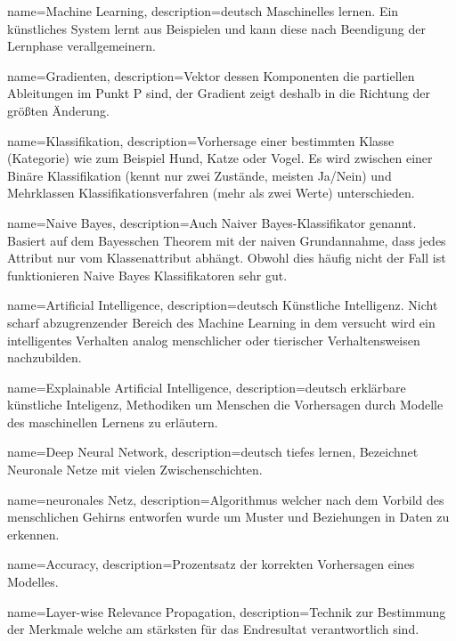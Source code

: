 
{
	name=Machine Learning,
	description={deutsch Maschinelles lernen. Ein künstliches System lernt aus Beispielen und kann diese nach Beendigung der Lernphase verallgemeinern. }
}

{
	name=Gradienten,
	description={Vektor dessen Komponenten die partiellen Ableitungen im Punkt P sind, der Gradient zeigt deshalb in die Richtung der größten Änderung. }
}

{
	name=Klassifikation,
	description={Vorhersage einer bestimmten Klasse (Kategorie) wie zum Beispiel Hund, Katze oder Vogel. Es wird zwischen einer Binäre Klassifikation (kennt nur zwei Zustände, meisten Ja/Nein) und Mehrklassen Klassifikationsverfahren (mehr als zwei Werte) unterschieden.  }
}

{
	name=Naive Bayes,
	description={Auch Naiver Bayes-Klassifikator genannt. Basiert auf dem Bayesschen Theorem mit der naiven Grundannahme, dass jedes Attribut nur vom Klassenattribut abhängt. Obwohl dies häufig nicht der Fall ist funktionieren Naive Bayes Klassifikatoren sehr gut. }
}

{
	name=Artificial Intelligence,
	description={deutsch Künstliche Intelligenz. Nicht scharf abzugrenzender Bereich des Machine Learning in dem versucht wird ein intelligentes Verhalten
	 analog menschlicher oder tierischer Verhaltensweisen nachzubilden. }
}

{
	name=Explainable Artificial Intelligence,
	description={deutsch erklärbare künstliche Inteligenz, Methodiken um Menschen die Vorhersagen durch Modelle des maschinellen Lernens zu erläutern. }
}

{
    name=Deep Neural Network,
    description={deutsch tiefes lernen, Bezeichnet Neuronale Netze mit vielen Zwischenschichten.}
}

{
	name=neuronales Netz,
	description={Algorithmus welcher nach dem Vorbild des menschlichen Gehirns entworfen wurde um Muster und Beziehungen in Daten zu erkennen.}   
}   

{
	name=Accuracy,
	description={Prozentsatz der korrekten Vorhersagen eines Modelles.}   
}   

{
	name=Layer-wise Relevance Propagation,
	description={Technik zur Bestimmung der Merkmale welche am stärksten für das Endresultat verantwortlich sind.}                                   
}                          

